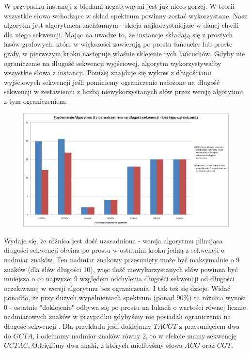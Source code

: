 \documentclass[a4paper,10pt]{article}
\begin{document}
W przypadku instancji z błędami negatywnymi jest już nieco gorzej. W teorii wszystkie słowa wchodzące w skład spektrum powinny 
zostać wykorzystane. Nasz algorytm jest algorytmem zachłannym - skleja najkorzystniejsze w danej chwili dla niego sekwencji. 
Mając na uwadze to, że instancje składają się z prostych lasów grafowych, które w większości zawierają po prostu łańcuchy lub 
proste grafy, w pierwszym kroku następuje właśnie sklejenie tych łańcuchów. Gdyby nie ograniczenie na długość sekwencji wyjściowej, 
algorytm wykorzystywałby wszystkie słowa z instancji. Poniżej znajduje się wykres z długościami wyjściowych sekwencji jeśli pominiemy 
ograniczenie nałożone na długość sekwencji w zestawieniu z liczbą niewykorzystanych słów przez wersję algorytmu z tym ograniczeniem.

\begin{figure}[h]
  \footnotesize\centering
  \includegraphics[width=\textwidth,keepaspectratio]{withoutNConstraint_general_negative.png}
\end{figure}

Wydaje się, że różnica jest dość uzasadniona - wersja algorytmu pilnująca długości sekwencji obcina po prostu w ostatnim kroku 
jedną z sekwencji o nadmiar znaków. Ten nadmiar znakowy przesunięty może być maksymalnie o 9 znaków (dla słów długości 10), 
więc ilość niewykorzystanych słów powinna być mniejsza o co najwyżej 9 względem odchylenia długości sekwencji od długości 
oczekiwanej w wersji algorytmu bez ograniczenia. I tak też się dzieje. Widać ponadto, że przy dużych wypełnieniach spektrum 
(ponad 90\%) ta różnica wynosi 0 - ostatnie "doklejenie" odbywa się po prostu na łukach o wartości równej licznie nadmiarowych 
znaków w przypadku gdybyśmy nie posiadali ograniczenia na długość sekwencji . Dla przykładu jeśli doklejamy $TACGT$ z przesunięciem 
dwa do $GCTA$, i odcinamy nadmiar znaków równy 2, to w efekcie mamy sekwencję $GCTAC$. Odcięliśmy dwa znaki, z których mielibyśmy słowa $ACG$ oraz $CGT$.
\end{document}
